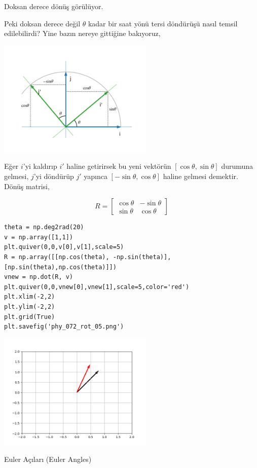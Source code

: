 \documentclass[12pt,fleqn]{article}\usepackage{../../common}
\begin{document}
Doksan derece dönüş görülüyor.

Peki doksan derece değil $\theta$ kadar bir saat yönü tersi döndürüşü
nasıl temsil edilebilirdi? Yine bazın nereye gittiğine bakıyoruz,

\includegraphics[width=20em]{phy_072_rot_03.png}

Eğer $i$'yi kaldırıp $i'$ haline getirirsek bu yeni vektörün
$[\cos\theta,\sin\theta]$ durumuna gelmesi, $j$'yi döndürüp $j'$ yapınca
$[-\sin\theta,\cos\theta]$ haline gelmesi demektir. Dönüş matrisi,

$$
R = \left[\begin{array}{rr}
\cos\theta & -\sin\theta \\
\sin\theta & \cos\theta
\end{array}\right]
$$

\begin{verbatim}
theta = np.deg2rad(20)
v = np.array([1,1])
plt.quiver(0,0,v[0],v[1],scale=5)
R = np.array([[np.cos(theta), -np.sin(theta)],[np.sin(theta),np.cos(theta)]])
vnew = np.dot(R, v)
plt.quiver(0,0,vnew[0],vnew[1],scale=5,color='red')
plt.xlim(-2,2)
plt.ylim(-2,2)
plt.grid(True)
plt.savefig('phy_072_rot_05.png')
\end{verbatim}

\includegraphics[width=20em]{phy_072_rot_05.png}

Euler Açıları (Euler Angles)
\end{document}
